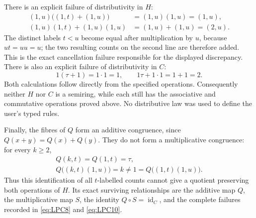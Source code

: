 There is an explicit failure of distributivity in \(H\):
\[
\begin{aligned}
(1,u)\bigl((1,t)+(1,u)\bigr)
  &=(1,u)(1,u)=(1,u),\\
(1,u)(1,t)+(1,u)(1,u)
  &=(1,u)+(1,u)=(2,u).
\end{aligned}
\tag{LPC11}\label{eq:LPC11}
\]
The distinct labels \(t<u\) become equal after multiplication by \(u\),
because \(ut=uu=u\); the two resulting counts on the second line are
therefore added.  This is the exact cancellation failure responsible
for the displayed discrepancy.  There is also an explicit failure of
distributivity in \(C\):
\[
1(\tau+1)=1\cdot1=1,
\qquad
1\tau+1\cdot1=1+1=2.
\tag{LPC12}\label{eq:LPC12}
\]
Both calculations follow directly from the specified operations.
Consequently neither \(H\) nor \(C\) is a semiring, while each still has
the associative and commutative operations proved above.  No
distributive law was used to define the user's typed rules.

Finally, the fibres of \(Q\) form an additive congruence, since
\(Q(x+y)=Q(x)+Q(y)\).  They do not form a multiplicative congruence:
for every \(k\geq2\),
\[
\begin{gathered}
Q(k,t)=Q(1,t)=\tau,\\
Q\bigl((k,t)(1,u)\bigr)=k\ne1
 =Q\bigl((1,t)(1,u)\bigr).
\end{gathered}
\tag{LPC13}\label{eq:LPC13}
\]
Thus this identification of all \(t\)-labelled counts cannot give a
quotient preserving both operations of \(H\).  Its exact surviving
relationships are the additive map \(Q\), the multiplicative map \(S\),
the identity \(Q\circ S=\operatorname{id}_C\), and the complete failures
recorded in \eqref{eq:LPC8} and \eqref{eq:LPC10}.
